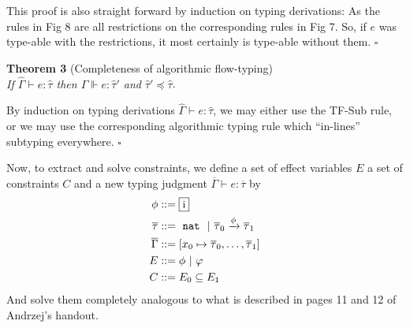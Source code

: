 This proof is also straight forward by induction on typing derivations:
As the rules in Fig 8 are all restrictions
on the corresponding rules in Fig 7. So, if $e$ was type-able with the restrictions,
it most certainly is type-able without them.
\hfill$\square$

{\bf Theorem 3} (Completeness of algorithmic flow-typing)\\
{\it If $\hat\Gamma \vdash e : \hat\tau$ then $\hat\Gamma \Vdash e : \hat\tau'$
and $\hat\tau' \preceq \hat\tau$}.

By induction on typing derivations $\hat\Gamma \vdash e : \hat\tau$,
we may either use the TF-Sub rule, or we may use the corresponding
algorithmic typing rule which ``in-lines'' subtyping everywhere.
\hfill$\square$

Now, to extract and solve constraints, we define a set of effect variables $E$
a set of constraints $C$ and a new typing judgment $\overline\Gamma \vdash e : \overline\tau$ by
\begin{align*}
  \phi &::= \BX{i}\\
  \overline\tau &::= \SLIT{nat} \OR \overline\tau_0 \xrightarrow{\phi} \overline\tau_1\\
  \overline\Gamma &::= [x_0 \mapsto \overline\tau_0, \dots, \overline \tau_1]\\
  E &::= \phi \OR \varphi\\
  C &::= E_0 \subseteq E_1
\end{align*}
And solve them completely analogous to what is described in
pages 11 and 12 of Andrzej's handout\cite{fun}.
